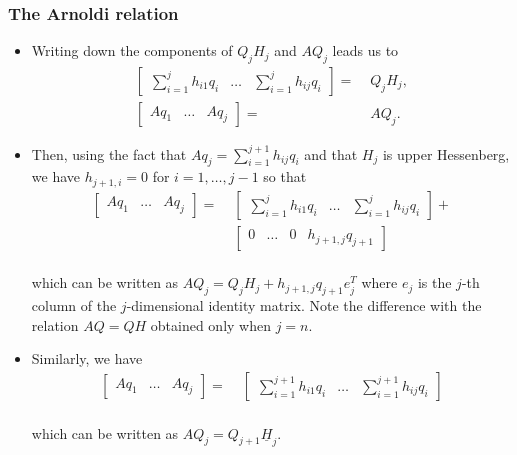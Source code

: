 \documentclass[t,usepdftitle=false]{beamer}
\begin{document}
\begin{frame}
\frametitle{The Arnoldi relation}	
\begin{itemize}
\item Writing down the components of $Q_jH_j$ and $AQ_j$ leads us to
\vspace{-.2cm}
\begin{align*}
\left[\begin{matrix}
\sum_{i=1}^{j}h_{i1}q_i&\dots&\sum_{i=1}^{j}h_{ij}q_i\end{matrix}\right]=&\;Q_jH_j,\\
\left[\begin{matrix}Aq_1&\dots&Aq_j\end{matrix}\right]=&\;AQ_j.
\end{align*}
\item Then, using the fact that $Aq_j=\sum_{i=1}^{j+1}h_{ij}q_i$ and that $H_j$ is upper Hessenberg, we have $h_{j+1,i}=0$ for $i=1,\dots,j-1$ so that
\vspace{-.2cm}
\begin{align*}
\left[\begin{matrix}Aq_1&\dots&Aq_j\end{matrix}\right]=
&\;\left[\begin{matrix}
\sum_{i=1}^{j}h_{i1}q_i&\dots&\sum_{i=1}^{j}h_{ij}q_i\end{matrix}\right]+\\
&\;\left[\begin{matrix}
0&\dots&0&h_{j+1,j}q_{j+1}\end{matrix}\right]
\end{align*}
\vspace{-.5cm}\\
which can be written as $\boxed{AQ_j=Q_jH_j+h_{j+1,j}q_{j+1}e_j^T}$ where $e_j$ is the $j$-th column of the $j$-dimensional identity matrix. 
Note the difference with the relation $AQ=QH$ obtained only when $j=n$.
\item Similarly, we have
\vspace{-.25cm}
\begin{align*}
\left[\begin{matrix}Aq_1&\dots&Aq_j\end{matrix}\right]=
&\;\left[\begin{matrix}
\sum_{i=1}^{j+1}h_{i1}q_i&\dots&\sum_{i=1}^{j+1}h_{ij}q_i\end{matrix}\right]
\end{align*}
\vspace{-.35cm}\\
which can be written as $\boxed{AQ_j=Q_{j+1}\underline{H}_j}$.
\end{itemize}
\end{frame} 
\end{document}
